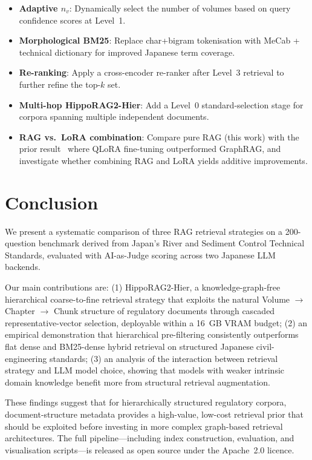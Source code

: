 \documentclass[twocolumn]{article}
\begin{document}
\begin{itemize}
  \item \textbf{Adaptive $n_v$}: Dynamically select the number of volumes
        based on query confidence scores at Level~1.
  \item \textbf{Morphological BM25}: Replace char+bigram tokenisation with
        MeCab + technical dictionary for improved Japanese term coverage.
  \item \textbf{Re-ranking}: Apply a cross-encoder re-ranker after Level~3
        retrieval to further refine the top-$k$ set.
  \item \textbf{Multi-hop HippoRAG2-Hier}: Add a Level~0 standard-selection
        stage for corpora spanning multiple independent documents.
  \item \textbf{RAG vs.\ LoRA combination}: Compare pure RAG (this work) with
        the prior result~\cite{yasuno2026graphrag} where QLoRA fine-tuning
        outperformed GraphRAG, and investigate whether combining RAG and LoRA
        yields additive improvements.
\end{itemize}

\section{Conclusion}
\label{sec:conclusion}

We present a systematic comparison of three RAG retrieval strategies on a
200-question benchmark derived from Japan's River and Sediment Control Technical
Standards, evaluated with AI-as-Judge scoring across two Japanese LLM backends.

Our main contributions are:
(1) HippoRAG2-Hier, a knowledge-graph-free hierarchical coarse-to-fine retrieval
strategy that exploits the natural Volume $\to$ Chapter $\to$ Chunk structure of
regulatory documents through cascaded representative-vector selection,
deployable within a 16~GB VRAM budget;
(2) an empirical demonstration that hierarchical pre-filtering consistently
outperforms flat dense and BM25-dense hybrid retrieval on structured
Japanese civil-engineering standards;
(3) an analysis of the interaction between retrieval strategy and LLM model
choice, showing that models with weaker intrinsic domain knowledge benefit
more from structural retrieval augmentation.

These findings suggest that for hierarchically structured regulatory corpora,
document-structure metadata provides a high-value, low-cost retrieval prior
that should be exploited before investing in more complex graph-based retrieval
architectures.
The full pipeline---including index construction, evaluation, and visualisation
scripts---is released as open source under the Apache~2.0 licence.
\end{document}

